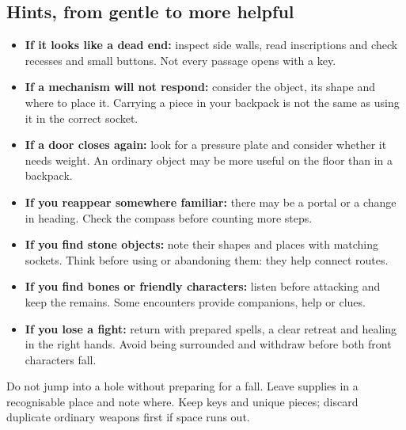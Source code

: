 \subsection*{Hints, from gentle to more helpful}
\begin{itemize}
\item \textbf{If it looks like a dead end:} inspect side walls, read inscriptions and check recesses and small buttons. Not every passage opens with a key.
\item \textbf{If a mechanism will not respond:} consider the object, its shape and where to place it. Carrying a piece in your backpack is not the same as using it in the correct socket.
\item \textbf{If a door closes again:} look for a pressure plate and consider whether it needs weight. An ordinary object may be more useful on the floor than in a backpack.
\item \textbf{If you reappear somewhere familiar:} there may be a portal or a change in heading. Check the compass before counting more steps.
\item \textbf{If you find stone objects:} note their shapes and places with matching sockets. Think before using or abandoning them: they help connect routes.
\item \textbf{If you find bones or friendly characters:} listen before attacking and keep the remains. Some encounters provide companions, help or clues.
\item \textbf{If you lose a fight:} return with prepared spells, a clear retreat and healing in the right hands. Avoid being surrounded and withdraw before both front characters fall.
\end{itemize}

Do not jump into a hole without preparing for a fall. Leave supplies in a recognisable place and note where. Keep keys and unique pieces; discard duplicate ordinary weapons first if space runs out.

